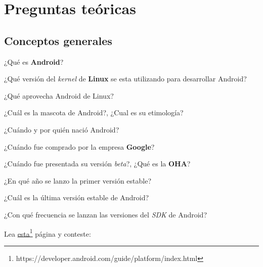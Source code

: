 \section{Preguntas teóricas}

\subsection{Conceptos generales}
\begin{questions}
  \question ¿Qué es \textbf{Android}?
  
  \question ¿Qué versión del \textit{kernel} de \textbf{Linux} se esta utilizando para desarrollar Android?

  \question ¿Qué aprovecha Android de Linux?

  \question ¿Cuál es la mascota de Android?, ¿Cual es su etimología?
  
  \question ¿Cuándo y por quién nació Android?
  
  \question ¿Cuándo fue comprado por la empresa \textbf{Google}?
  
  \question ¿Cuándo fue presentada su versión \textit{beta}?, ¿Qué es la \textbf{OHA}?
  
  \question ¿En qué año se lanzo la primer versión estable?
  
  \question ¿Cuál es la última versión estable de Android?
  
  \question ¿Con qué frecuencia se lanzan las versiones del \textit{SDK} de Android?
  
  \question Lea \href{https://developer.android.com/guide/platform/index.html}{esta}\footnote{https://developer.android.com/guide/platform/index.html} página y conteste:
\end{questions}
